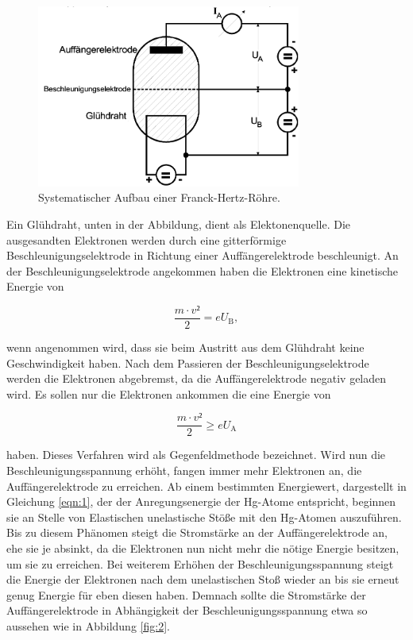 \begin{figure}[H]
  \centering
  \includegraphics[height=6cm]{ressources/aufbau.png}
  \caption{Systematischer Aufbau einer Franck-Hertz-Röhre. \cite{sample}}
  \label{fig:1}
\end{figure}

Ein Glühdraht, unten in der Abbildung, dient als Elektonenquelle.
Die ausgesandten Elektronen werden durch eine gitterförmige Beschleunigungselektrode in Richtung einer Auffängerelektrode beschleunigt.
An der Beschleunigungselektrode angekommen haben die Elektronen eine kinetische Energie von

\begin{equation}
  \frac{m \cdot v²}{2} = eU_{\text{B}}, \label{eqn:3}
\end{equation}

wenn angenommen wird, dass sie beim Austritt aus dem Glühdraht keine Geschwindigkeit haben.
Nach dem Passieren der Beschleunigungselektrode werden die Elektronen abgebremst, da die Auffängerelektrode negativ geladen wird.
Es sollen nur die Elektronen ankommen die eine Energie von

\begin{equation}
  \frac{m \cdot v²}{2} \ge eU_{\text{A}} \label{eqn:4}
\end{equation}

haben.
Dieses Verfahren wird als Gegenfeldmethode bezeichnet.
Wird nun die Beschleunigungsspannung erhöht, fangen immer mehr Elektronen an, die Auffängerelektrode zu erreichen.
Ab einem bestimmten Energiewert, dargestellt in Gleichung \ref{eqn:1}, der der Anregungsenergie der Hg-Atome entspricht, beginnen sie an Stelle von Elastischen unelastische Stöße mit den Hg-Atomen auszuführen.
Bis zu diesem Phänomen steigt die Stromstärke an der Auffängerelektrode an, ehe sie je absinkt, da die Elektronen nun nicht mehr die nötige Energie besitzen, um sie zu erreichen.
Bei weiterem Erhöhen der Beschleunigungsspannung steigt die Energie der Elektronen nach dem unelastischen Stoß wieder an bis sie erneut genug Energie für eben diesen haben.
Demnach sollte die Stromstärke der Auffängerelektrode in Abhängigkeit der Beschleunigungsspannung etwa so aussehen wie in Abbildung \ref{fig:2}.

